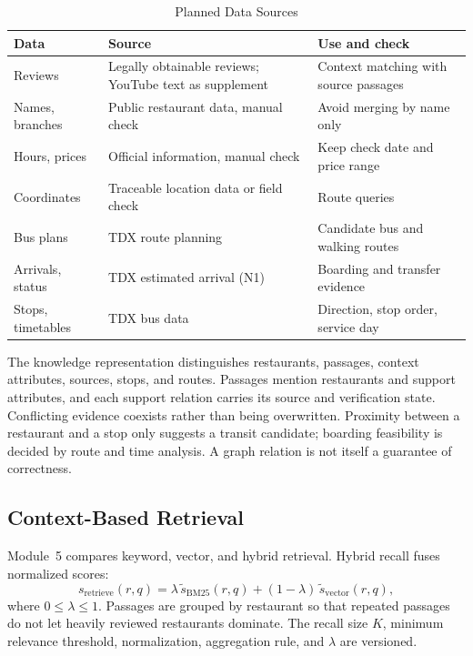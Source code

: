 \documentclass[conference]{IEEEtran}
\begin{document}
\begin{table}[t]
\caption{Planned Data Sources}
\label{tab:data}
\centering
\footnotesize
\begin{tabularx}{\columnwidth}{@{}>{\raggedright\arraybackslash}p{}LL@{}}
\toprule
Data & Source & Use and check \\
\midrule
Reviews & Legally obtainable reviews; YouTube text as supplement & Context matching with source passages \\
Names, branches & Public restaurant data, manual check & Avoid merging by name only \\
Hours, prices & Official information, manual check & Keep check date and price range \\
Coordinates & Traceable location data or field check & Route queries \\
Bus plans & TDX route planning & Candidate bus and walking routes \\
Arrivals, status & TDX estimated arrival (N1) & Boarding and transfer evidence \\
Stops, timetables & TDX bus data & Direction, stop order, service day \\
\bottomrule
\end{tabularx}
\end{table}

The knowledge representation distinguishes restaurants, passages, context attributes, sources, stops, and routes. Passages mention restaurants and support attributes, and each support relation carries its source and verification state. Conflicting evidence coexists rather than being overwritten. Proximity between a restaurant and a stop only suggests a transit candidate; boarding feasibility is decided by route and time analysis. A graph relation is not itself a guarantee of correctness.

\subsection{Context-Based Retrieval}
Module~5 compares keyword, vector, and hybrid retrieval. Hybrid recall fuses normalized scores:
\begin{equation}
s_{\mathrm{retrieve}}(r,q)=\lambda\, \tilde{s}_{\mathrm{BM25}}(r,q)+(1-\lambda)\,\tilde{s}_{\mathrm{vector}}(r,q),
\label{eq:hybrid}
\end{equation}
where $0\le\lambda\le1$. Passages are grouped by restaurant so that repeated passages do not let heavily reviewed restaurants dominate. The recall size $K$, minimum relevance threshold, normalization, aggregation rule, and $\lambda$ are versioned.
\end{document}
